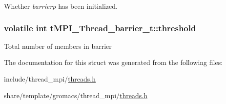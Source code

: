 \-Whether {\itshape barrierp\/} has been initialized. \hypertarget{structtMPI__Thread__barrier__t_a237aad70c322000adfa99d786590a443}{
\subsubsection[{threshold}]{\setlength{\rightskip}{0pt plus 5cm}volatile int {\bf t\-M\-P\-I\-\_\-\-Thread\-\_\-barrier\-\_\-t\-::threshold}}}\label{structtMPI__Thread__barrier__t_a237aad70c322000adfa99d786590a443}
\-Total number of members in barrier 

\-The documentation for this struct was generated from the following files\-:\begin{DoxyCompactItemize}
\item 
include/thread\-\_\-mpi/\hyperlink{include_2thread__mpi_2threads_8h}{threads.\-h}\item 
share/template/gromacs/thread\-\_\-mpi/\hyperlink{share_2template_2gromacs_2thread__mpi_2threads_8h}{threads.\-h}\end{DoxyCompactItemize}
